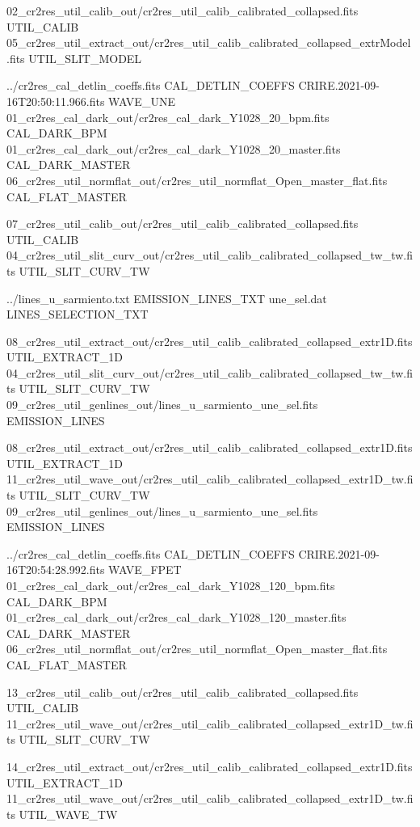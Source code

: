\begin{shell}[fontsize=\footnotesize]
02_cr2res_util_calib_out/cr2res_util_calib_calibrated_collapsed.fits UTIL_CALIB
05_cr2res_util_extract_out/cr2res_util_calib_calibrated_collapsed_extrModel.fits UTIL_SLIT_MODEL

../cr2res_cal_detlin_coeffs.fits CAL_DETLIN_COEFFS
CRIRE.2021-09-16T20:50:11.966.fits      WAVE_UNE 
01_cr2res_cal_dark_out/cr2res_cal_dark_Y1028_20_bpm.fits CAL_DARK_BPM
01_cr2res_cal_dark_out/cr2res_cal_dark_Y1028_20_master.fits CAL_DARK_MASTER
06_cr2res_util_normflat_out/cr2res_util_normflat_Open_master_flat.fits CAL_FLAT_MASTER

07_cr2res_util_calib_out/cr2res_util_calib_calibrated_collapsed.fits UTIL_CALIB
04_cr2res_util_slit_curv_out/cr2res_util_calib_calibrated_collapsed_tw_tw.fits UTIL_SLIT_CURV_TW

../lines_u_sarmiento.txt EMISSION_LINES_TXT
une_sel.dat LINES_SELECTION_TXT

08_cr2res_util_extract_out/cr2res_util_calib_calibrated_collapsed_extr1D.fits UTIL_EXTRACT_1D
04_cr2res_util_slit_curv_out/cr2res_util_calib_calibrated_collapsed_tw_tw.fits UTIL_SLIT_CURV_TW
09_cr2res_util_genlines_out/lines_u_sarmiento_une_sel.fits EMISSION_LINES

08_cr2res_util_extract_out/cr2res_util_calib_calibrated_collapsed_extr1D.fits UTIL_EXTRACT_1D
11_cr2res_util_wave_out/cr2res_util_calib_calibrated_collapsed_extr1D_tw.fits UTIL_SLIT_CURV_TW
09_cr2res_util_genlines_out/lines_u_sarmiento_une_sel.fits EMISSION_LINES

../cr2res_cal_detlin_coeffs.fits CAL_DETLIN_COEFFS
CRIRE.2021-09-16T20:54:28.992.fits      WAVE_FPET
01_cr2res_cal_dark_out/cr2res_cal_dark_Y1028_120_bpm.fits CAL_DARK_BPM
01_cr2res_cal_dark_out/cr2res_cal_dark_Y1028_120_master.fits CAL_DARK_MASTER
06_cr2res_util_normflat_out/cr2res_util_normflat_Open_master_flat.fits CAL_FLAT_MASTER

13_cr2res_util_calib_out/cr2res_util_calib_calibrated_collapsed.fits UTIL_CALIB
11_cr2res_util_wave_out/cr2res_util_calib_calibrated_collapsed_extr1D_tw.fits UTIL_SLIT_CURV_TW

14_cr2res_util_extract_out/cr2res_util_calib_calibrated_collapsed_extr1D.fits UTIL_EXTRACT_1D
11_cr2res_util_wave_out/cr2res_util_calib_calibrated_collapsed_extr1D_tw.fits UTIL_WAVE_TW
\end{shell}

